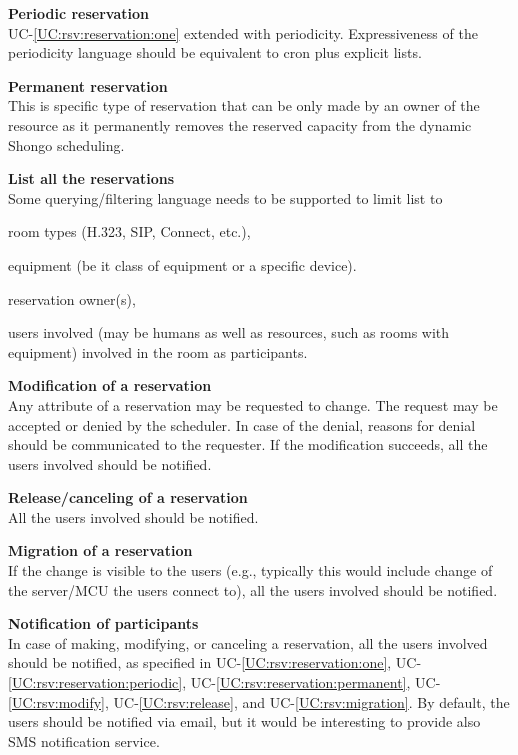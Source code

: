\documentclass[a4paper]{report}
\makeatletter
\newcounter{UCcounter}
\newenvironment{UseCases}%
	{\begin{list}{\textbf{UC-\arabic{UCcounter}}}{\@nmbrlisttrue\def\@listctr{UCcounter}}}%
	{\end{list}}
\newcommand{\UClabel}[1]{\label{UC:#1}}
\newcommand{\UCref}[1]{UC-\ref{UC:#1}}
\newcommand{\UseCase}[2]{\item\UClabel{#2} \textbf{#1}\\}
\makeatother
\begin{document}
\begin{UseCases}
\UseCase{Periodic reservation}{rsv:reservation:periodic}

\UCref{rsv:reservation:one} extended with periodicity. Expressiveness of the
periodicity language should be equivalent to cron plus explicit lists.

\UseCase{Permanent reservation}{rsv:reservation:permanent}

This is specific type of reservation that can be only made by an owner of the
resource as it permanently removes the reserved capacity from the dynamic
Shongo scheduling.

\UseCase{List all the reservations}{rsv:list}

Some querying/filtering language needs to be supported to limit list to

\begin{compactitem}

\item room types (H.323, SIP, Connect, etc.),

\item equipment (be it class of equipment or a specific device).

\item reservation owner(s),

\item users involved (may be humans as well as resources, such as rooms with
equipment) involved in the room as participants.

\end{compactitem}

\UseCase{Modification of a reservation}{rsv:modify}

Any attribute of a reservation may be requested to change. The request may be
accepted or denied by the scheduler. In case of the denial, reasons for denial
should be communicated to the requester. If the modification succeeds, all the
users involved should be notified.

\UseCase{Release/canceling of a reservation}{rsv:release}

All the users involved should be notified.

\UseCase{Migration of a reservation}{rsv:migration}

If the change is visible to the users (e.g., typically this would include
change of the server/MCU the users connect to), all the users involved should
be notified.

\UseCase{Notification of participants}{rsv:notification}

In case of making, modifying, or canceling a reservation, all the users
involved should be notified, as specified in \UCref{rsv:reservation:one},
\UCref{rsv:reservation:periodic}, \UCref{rsv:reservation:permanent},
\UCref{rsv:modify}, \UCref{rsv:release}, and \UCref{rsv:migration}. By default,
the users should be notified via email, but it would be interesting to provide
also SMS notification service.


\end{UseCases}
\end{document}
